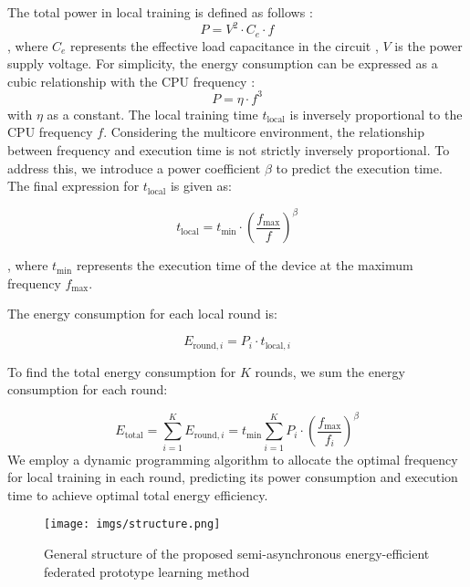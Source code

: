 \documentclass[journal]{IEEEtran}
\begin{document}
The total power in local training is defined as follows \cite{feng2021min}:
\begin{equation}
P=V^{2}\cdot C_e\cdot f
\end{equation}
, where $C_e$ represents the effective load capacitance in the circuit \cite{burd1996processor}, $V$ is the power supply voltage. For simplicity, the energy consumption can be expressed as a cubic relationship with the CPU frequency \cite{zhu2019energy}:
\begin{equation}
P=\eta\cdot f^3
\end{equation}
with $\eta$ as a constant.  The local training time \( t_{\text{local}} \) is inversely proportional to the CPU frequency \( f \). Considering the multicore environment, the relationship between frequency and execution time is not strictly inversely proportional. To address this, we introduce a power coefficient \( \beta \) to predict the execution time. The final expression for \( t_{\text{local}} \) is given as:

\begin{equation}
t_{\text{local}} = t_{\text{min}} \cdot \left( \frac{f_{\text{max}}}{f} \right)^\beta
\end{equation}

, where \( t_{\text{min}} \) represents the execution time of the device at the maximum frequency \( f_{\text{max}} \).

The energy consumption for each local round is:

\begin{equation}
E_{\text{round}, i} = P_i \cdot t_{\text{local}, i} 
\end{equation}

To find the total energy consumption for \( K \) rounds, we sum the energy consumption for each round:

\begin{equation}
E_{\text{total}} = \sum_{i=1}^{K} E_{\text{round}, i} = t_{\text{min}}\sum_{i=1}^{K} P_i  \cdot \left( \frac{f_{\text{max}}}{f_i} \right)^\beta
\end{equation}
We employ a dynamic programming algorithm to allocate the optimal frequency for local training in each round, predicting its power consumption and execution time to achieve optimal total energy efficiency.

\begin{figure*}[ht]
    \centering
    \texttt{[image: imgs/structure.png]}
    \caption{General structure of the proposed semi-asynchronous energy-efficient federated prototype learning method}
    \label{fig:structure}
\end{figure*}
\end{document}
